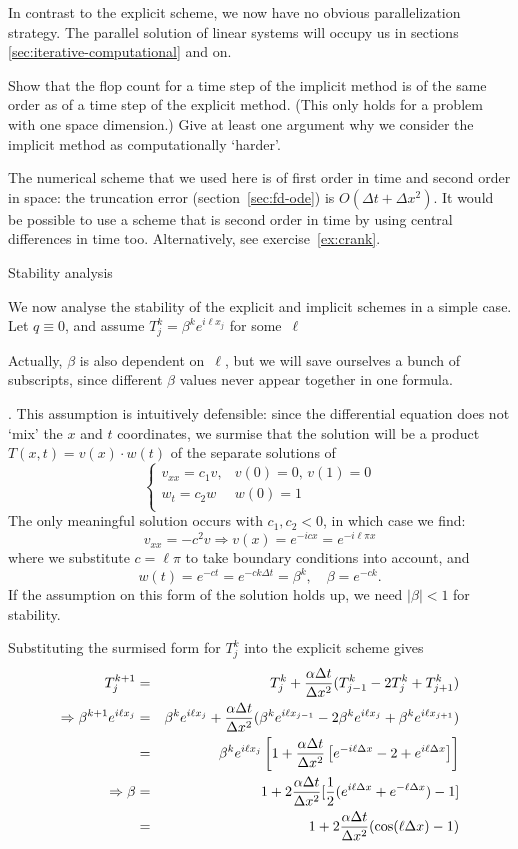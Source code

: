 In contrast to the explicit scheme, we now have no 
obvious parallelization strategy. The parallel solution of linear
systems will occupy us in sections \ref{sec:iterative-computational}
and on.

\begin{exercise}
  Show that the flop count for a time step of the implicit method is
  of the same order as of a time step of the explicit method. (This
  only holds for a problem with one space dimension.) Give at least
  one argument why we consider the implicit method as computationally
  `harder'.
\end{exercise}

The numerical scheme that we used here is of first order in time and
second order in space: the truncation error (section~\ref{sec:fd-ode})
is $O(\Delta t+\Delta x^2)$. It would be possible to use a scheme that
is second order in time by using central differences in time
too. Alternatively, see exercise~\ref{ex:crank}.

 {Stability analysis}

We now analyse the stability of the explicit and implicit
schemes in a simple case. Let $q\equiv0$, and assume
$T_j^k=\beta^ke^{i\ell x_j}$ for some~$\ell$
\begin{footnoteenv}
  {Actually,
  $\beta$ is also dependent on~$\ell$, but we will save ourselves a
  bunch of subscripts, since different $\beta$ values never appear
  together in one formula.}
\end{footnoteenv}
. This assumption is intuitively
defensible: since the differential equation does not `mix' the $x$ and
$t$ coordinates, we surmise that the solution will be a product
$T(x,t)=v(x)\cdot w(t)$ of the
separate solutions of
\[
\begin{cases}
  v_{xx}=c_1 v,&v(0)=0,\,v(1)=0\\
  w_t=c_2 w & w(0)=1\\
\end{cases}
\]
The only meaningful solution occurs with $c_1,c_2<0$, in which case we
find:
\[ v_{xx}=-c^2v \Rightarrow v(x)=e^{-icx}=e^{-i\ell\pi x} \]
where we substitute $c=\ell\pi$ to take boundary conditions into
account,
and 
\[ w(t) = e^{-ct} = e^{-ck\Delta t} = \beta^k,\quad \beta=e^{-ck}. \]
If the assumption on this form of the solution holds up, we need
$|\beta|<1$ for stability.

Substituting the surmised form for $T_j^k$ into the  explicit scheme gives
  \begin{eqnarray*}
    T_j^{k+1}&=&T_j^k+\frac{\alpha\Delta t}{\Delta x^2}(T_{j-1}^k-2T_j^k+T_{j+1}^k)\\
    \Rightarrow \beta^{k+1}e^{i\ell x_j}&=&\beta^ke^{i\ell x_j}
    +\frac{\alpha\Delta t}{\Delta x^2} (\beta^ke^{i\ell x_{j-1}}-2\beta^ke^{i\ell x_j}+\beta^ke^{i\ell x_{j+1}})\\
    &=&\beta^ke^{i\ell x_j}\left[1+\frac{\alpha\Delta t}{\Delta x^2}\left[e^{-i\ell\Delta x}-2+e^{i\ell\Delta x}\right]\right]\\
    \Rightarrow \beta&=&
    1+2\frac{\alpha\Delta t}{\Delta x^2}[\frac12(e^{i\ell\Delta x}+e^{-\ell\Delta x})-1]\\
    &=&1+2\frac{\alpha\Delta t}{\Delta x^2}(\cos(\ell\Delta x)-1)
  \end{eqnarray*}

